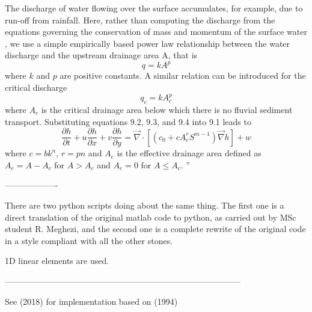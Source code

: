 The discharge of water flowing over the surface accumulates, for example, due to run-off from rainfall. Here,
rather than computing the discharge from the equations governing the conservation of mass and
momentum of the surface water \textcite{sica06}, we use a simple empirically 
based power law relationship between the water discharge and the upstream drainage area A,
that is
\[
q=kA^p
\]
where $k$ and $p$ are positive constants. A similar relation can be introduced for the critical discharge
\[
q_c=kA_c^p
\]
where $A_c$ is the critical drainage area below which there is no fluvial sediment transport. Substituting
equations 9.2, 9.3, and 9.4 into 9.1 leads to
\[
\frac{\partial h}{\partial t} + u \frac{\partial h}{\partial x}+ v \frac{\partial h}{\partial y}
= \vec\nabla \cdot \left[
(c_0 + c A_e^r S^{m-1}) \vec\nabla h
\right] + w
\]
where $c=bk^n$, $r=pn$ and $A_e$ is the effective drainage area defined as $A_e = A-A_c$ 
for $A>A_c$ and $A_e = 0$ for $A \le A_c$.
''

-------------------

There are two python scripts doing about the same thing. The first one is a direct translation 
of the original matlab code to python, as carried out by MSc student R. Meghezi, and the second
one is a complete rewrite of the original code in a style compliant with all the other stones.

1D linear elements are used.

------------------------------------------------------------------------------------

See \textcite{yaca18} (2018) for implementation based on \textcite{kobe94} (1994)



